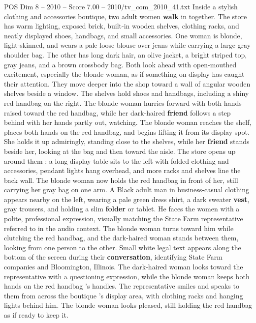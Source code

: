 \begin{textsample}{POS Dim 8 – 2010 – Score 7.00 – 2010/tv\_com\_2010\_41.txt}  \label{ex:f8_pos_025}
Inside a stylish clothing and accessories boutique, two adult women \textbf{walk} in together.
The store has warm lighting, exposed brick, built-in wooden shelves, clothing racks, and neatly displayed shoes, handbags, and small accessories.
One woman is blonde, light-skinned, and wears a pale loose blouse over jeans while carrying a large gray shoulder bag.
The other has long dark hair, an olive jacket, a bright striped top, gray jeans, and a brown crossbody bag.
Both look ahead with open-mouthed excitement, especially the blonde woman, as if something on display has caught their attention.
They move deeper into the shop toward a wall of angular wooden shelves beside a window.
The shelves hold shoes and handbags, including a shiny red handbag on the right.
The blonde woman hurries forward with both hands raised toward the red handbag, while her dark-haired \textbf{friend} follows a step behind with her hands partly out, watching.
The blonde woman reaches the shelf, places both hands on the red handbag, and begins lifting it from its display spot.
She holds it up admiringly, standing close to the shelves, while her \textbf{friend} stands beside her, looking at the bag and then toward the aisle.
The store opens up around them : a long display table sits to the left with folded clothing and accessories, pendant lights hang overhead, and more racks and shelves line the back wall.
The blonde woman now holds the red handbag in front of her, still carrying her gray bag on one arm.
A Black adult man in business-casual clothing appears nearby on the left, wearing a pale green dress shirt, a dark sweater \textbf{vest}, gray trousers, and holding a slim \textbf{folder} or tablet.
He faces the women with a polite, professional expression, visually matching the State Farm representative referred to in the audio context.
The blonde woman turns toward him while clutching the red handbag, and the dark-haired woman stands between them, looking from one person to the other.
Small white legal text appears along the bottom of the screen during their \textbf{conversation}, identifying State Farm companies and Bloomington, Illinois.
The dark-haired woman looks toward the representative with a questioning expression, while the blonde woman keeps both hands on the red handbag ’s handles.
The representative smiles and speaks to them from across the boutique ’s display area, with clothing racks and hanging lights behind him.
The blonde woman looks pleased, still holding the red handbag as if ready to keep it.

\end{textsample}
